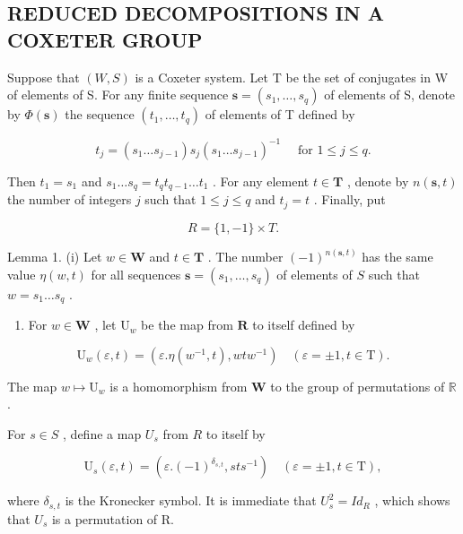 \subsection{REDUCED DECOMPOSITIONS IN A COXETER GROUP}

Suppose that \((W,S)\) is a Coxeter system. Let T be the set of conjugates in W of elements of S. For any finite sequence \(\mathbf{s}=(s_{1},\ldots,s_{q})\) of elements of S, denote by \(\Phi(\mathbf{s})\) the sequence \((t_{1},\ldots,t_{q})\) of elements of T defined by

\[
t _ {j} = \left(s _ {1} \dots s _ {j - 1}\right) s _ {j} \left(s _ {1} \dots s _ {j - 1}\right) ^ {- 1} \quad \text { for } 1 \leqslant j \leqslant q.\tag{11}
\]

Then \(t_1 = s_1\) and \(s_1 \ldots s_q = t_q t_{q-1} \ldots t_1\) . For any element \(t \in \mathbf{T}\) , denote by \(n(\mathbf{s}, t)\) the number of integers \(j\) such that \(1 \leqslant j \leqslant q\) and \(t_j = t\) . Finally, put

\[
R = \{1, - 1 \} \times T.
\]

Lemma 1. (i) Let \(w \in \mathbf{W}\) and \(t \in \mathbf{T}\) . The number \((-1)^{n(\mathbf{s},t)}\) has the same value \(\eta(w,t)\) for all sequences \(\mathbf{s} = (s_1, \ldots, s_q)\) of elements of \(S\) such that \(w = s_1 \ldots s_q\) .

\begin{enumerate}
\def\labelenumi{(\roman{enumi})}
\setcounter{enumi}{1}
\tightlist
\item
  For \(w \in \mathbf{W}\) , let \(\mathrm{U}_w\) be the map from \(\mathbf{R}\) to itself defined by
\end{enumerate}

\[
\mathrm{U} _ {w} (\varepsilon , t) = (\varepsilon . \eta (w ^ {- 1}, t), w t w ^ {- 1}) \quad (\varepsilon = \pm 1, t \in \mathrm{T}).\tag{12}
\]

The map \(w \mapsto \mathrm{U}_w\) is a homomorphism from \(\mathbf{W}\) to the group of permutations of \(\mathbb{R}\) .

For \(s \in S\) , define a map \(U_s\) from \(R\) to itself by

\[
\mathrm{U} _ {s} (\varepsilon , t) = \left(\varepsilon . (- 1) ^ {\delta_ {s, t}}, s t s ^ {- 1}\right) \quad (\varepsilon = \pm 1, t \in \mathrm{T}),\tag{13}
\]

where \(\delta_{s,t}\) is the Kronecker symbol. It is immediate that \(U_{s}^{2} = Id_{R}\) , which shows that \(U_{s}\) is a permutation of R.

